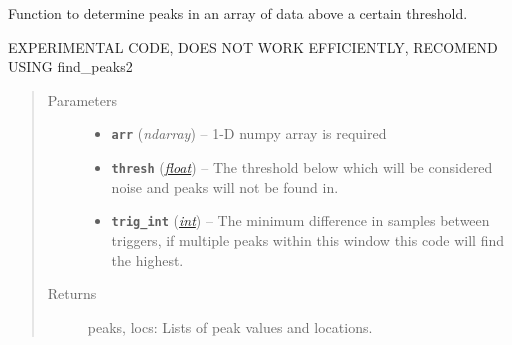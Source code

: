 \documentclass[a4paper,10pt,english]{sphinxmanual}
\begin{document}
\begin{fulllineitems}
\label{utils:findpeaks.find_peaks}
Function to determine peaks in an array of data above a certain threshold.

EXPERIMENTAL CODE, DOES NOT WORK EFFICIENTLY, RECOMEND USING find\_peaks2
\begin{quote}\begin{description}
\item[{Parameters}] \leavevmode\begin{itemize}
\item {} 
\textbf{\texttt{arr}} (\emph{ndarray}) -- 1-D numpy array is required

\item {} 
\textbf{\texttt{thresh}} (\href{https://docs.python.org/library/functions.html\#float}{\emph{float}}) -- The threshold below which will be considered noise and peaks    will not be found in.

\item {} 
\textbf{\texttt{trig\_int}} (\href{https://docs.python.org/library/functions.html\#int}{\emph{int}}) -- The minimum difference in samples between triggers,    if multiple peaks within this window this code will find the highest.

\end{itemize}

\item[{Returns}] \leavevmode
peaks, locs: Lists of peak values and locations.

\end{description}\end{quote}

\end{fulllineitems}

\end{document}
